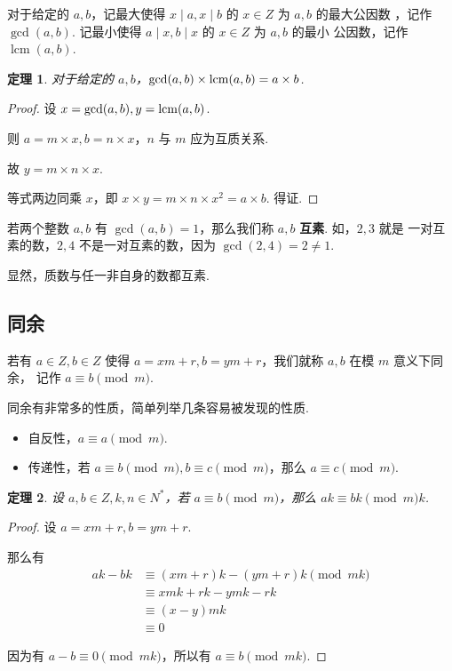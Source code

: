 \documentclass[a4paper]{article}
\newtheorem{theorem}{定理}[section]
\begin{document}
对于给定的 $a,b$，记最大使得 $x \mid a,x \mid b$ 的 $x\in Z$ 为 $a,b$ 的最大公因数
，记作 $\gcd(a,b)$. 记最小使得 $a\mid x,b\mid x$ 的 $x \in Z$ 为 $a,b$ 的最小
公因数，记作 $\operatorname{lcm}(a,b)$.

\begin{theorem}
    对于给定的 $a,b$，$\gcd(a,b)\times \operatornamewithlimits{lcm}(a,b)=a\times b$.
\end{theorem}

\begin{proof}
    设 $x=\gcd(a,b),y=\operatornamewithlimits{lcm}(a,b)$.

    则 $a=m\times x,b=n\times x$，$n$ 与 $m$ 应为互质关系.

    故 $y=m\times n\times x$.

    等式两边同乘 $x$，即 $x\times y=m\times n\times x^2=a\times b$. 得证.
\end{proof}

若两个整数 $a,b$ 有 $\gcd(a,b)=1$，那么我们称 $a,b$ \textbf{互素}. 如，$2,3$ 就是
一对互素的数，$2,4$ 不是一对互素的数，因为 $\gcd(2,4)=2\ne 1$.

显然，质数与任一非自身的数都互素.

\subsection{同余}

若有 $a\in Z,b\in Z$ 使得 $a=xm+r,b=ym+r$，我们就称 $a,b$ 在模 $m$ 意义下同余，
记作 $a\equiv b \pmod m$.

同余有非常多的性质，简单列举几条容易被发现的性质.

\begin{itemize}
    \item 自反性，$a\equiv a\pmod m$.
    \item 传递性，若 $a\equiv b\pmod m,b\equiv c \pmod m$，那么
          $a\equiv c\pmod m$.
\end{itemize}

\begin{theorem}
    设 $a,b \in Z, k,n\in N^*$，若 $a\equiv b \pmod m$，那么
    $ak\equiv bk \pmod mk$.
\end{theorem}

\begin{proof}
    设 $a=xm+r,b=ym+r$.

    那么有
    \begin{equation*}
        \begin{split}
            ak-bk&\equiv (xm+r)k-(ym+r)k\pmod {mk}\\
            &\equiv xmk+rk-ymk-rk\\
            &\equiv (x-y)mk\\
            &\equiv 0
        \end{split}
    \end{equation*}

    因为有 $a-b\equiv 0 \pmod {mk}$，所以有 $a \equiv b \pmod {mk}$.
\end{proof}
\end{document}
